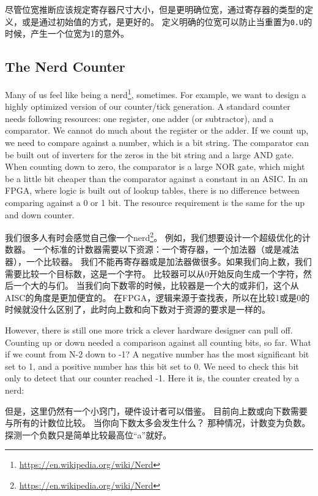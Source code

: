 \documentclass[%
    10pt,
    headinclude, footexclude,
    openright, %
    notitlepage,
    cleardoubleempty,
    headsepline,
    pointlessnumbers,
    bibtotoc, idxtotoc,
    ]{scrbook}
\newcommand{\code}[1]{{\small{\texttt{#1}}}}
\newcommand{\myref}[2]{\href{#1}{#2}}
\renewcommand{\myref}[2]{{#2}{\footnote{\url{#1}}}}
\begin{document}
尽管位宽推断应该规定寄存器尺寸大小，但是更明确位宽，通过寄存器的类型的定义，或是通过初始值的方式，是更好的。
定义明确的位宽可以防止当重置为\code{0.U}的时候，产生一个位宽为1的意外。

\subsection{The Nerd Counter}

Many of us feel like being a \myref{https://en.wikipedia.org/wiki/Nerd}{nerd}, sometimes.
For example, we want to design a highly optimized version of our counter/tick generation.
A standard counter needs following resources: one register, one adder (or subtractor),
and a comparator. We cannot do much about the register or the adder. If we count
up, we need to compare against a number, which is a bit string. The comparator
can be built out of inverters for the zeros in the bit string and a large AND gate.
When counting down to zero, the comparator is a large NOR gate, which might be
a little bit cheaper than the comparator against a constant in an ASIC.
In an FPGA, where logic is built out of lookup tables, there is no difference between comparing
against a 0 or 1 bit. The resource requirement is the same for the up and down counter.

我们很多人有时会感觉自己像一个\myref{https://en.wikipedia.org/wiki/Nerd}{nerd}。
例如，我们想要设计一个超级优化的计数器。
一个标准的计数器需要以下资源：一个寄存器，一个加法器（或是减法器），一个比较器。
我们不能再寄存器或是加法器做很多。如果我们向上数，我们需要比较一个目标数，这是一个字符。
比较器可以从0开始反向生成一个字符，然后一个大的与们。
当我们向下数零的时候，比较器是一个大的或非们，这个从AISC的角度是更加便宜的。
在FPGA，逻辑来源于查找表，所以在比较1或是0的时候就没什么区别了，此时向上数和向下数对于资源的要求是一样的。


However, there is still one more trick a clever hardware designer can pull off.
Counting up or down needed a comparison against all counting bits, so far.
What if we count from N-2 down to -1? A negative number has the most significant bit
set to 1, and a positive number has this bit set to 0. We need to check this bit only to detect
that our counter reached -1. Here it is, the counter created by a nerd:

但是，这里仍然有一个小窍门，硬件设计者可以借鉴。
目前向上数或向下数需要与所有的计数位比较。
当你向下数太多会发生什么？
那种情况，计数变为负数。探测一个负数只是简单比较最高位“a”就好。

\end{document}
